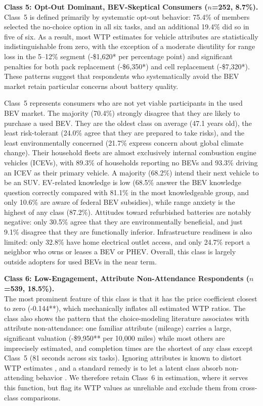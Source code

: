 \documentclass[a4paper,fleqn]{cas-sc}   %
\begin{document}
\medskip

\noindent\textbf{Class 5: Opt-Out Dominant, BEV-Skeptical Consumers ($n$=252, 8.7\%).}\\
Class~5 is defined primarily by systematic opt-out behavior: 75.4\% of members selected the no-choice option in all six tasks, and an additional 19.4\% did so in five of six. As a result, most WTP estimates for vehicle attributes are statistically indistinguishable from zero, with the exception of a moderate disutility for range loss in the 5--12\% segment (-\$1,620* per percentage point) and significant penalties for both pack replacement (-\$6,350*) and cell replacement (-\$7,320*). These patterns suggest that respondents who systematically avoid the BEV market retain particular concerns about battery quality.

Class~5 represents consumers who are not yet viable participants in the used BEV market. The majority (70.4\%) strongly disagree that they are likely to purchase a used BEV. They are the oldest class on average (47.1 years old), the least risk-tolerant (24.0\% agree that they are prepared to take risks), and the least environmentally concerned (21.7\% express concern about global climate change). Their household fleets are almost exclusively internal combustion engine vehicles (ICEVs), with 89.3\% of households reporting no BEVs and 93.3\% driving an ICEV as their primary vehicle. A majority (68.2\%) intend their next vehicle to be an SUV. EV-related knowledge is low (68.5\% answer the BEV knowledge question correctly compared with 81.1\% in the most knowledgeable group, and only 10.6\% are aware of federal BEV subsidies), while range anxiety is the highest of any class (87.2\%). Attitudes toward refurbished batteries are notably negative: only 30.5\% agree that they are environmentally beneficial, and just 9.1\% disagree that they are functionally inferior. Infrastructure readiness is also limited: only 32.8\% have home electrical outlet access, and only 24.7\% report a neighbor who owns or leases a BEV or PHEV. Overall, this class is largely outside adopters for used BEVs in the near term.

\medskip

\noindent\textbf{Class 6: Low-Engagement, Attribute Non-Attendance Respondents ($n$=539, 18.5\%).}\\
The most prominent feature of this class is that it has the price coefficient closest to zero (-0.144**), which mechanically inflates all estimated WTP ratios. The class also shows the pattern that the choice-modeling literature associates with attribute non-attendance: one familiar attribute (mileage) carries a large, significant valuation (-\$9,950** per 10,000 miles) while most others are imprecisely estimated, and completion times are the shortest of any class except Class~5 (81 seconds across six tasks). Ignoring attributes is known to distort WTP estimates \parencite{hensherImplicationsWillingnessPay2005}, and a standard remedy is to let a latent class absorb non-attending behavior \parencite{scarpaModellingAttributeNonattendance2009}. We therefore retain Class~6 in estimation, where it serves this function, but flag its WTP values as unreliable and exclude them from cross-class comparisons.
\end{document}
